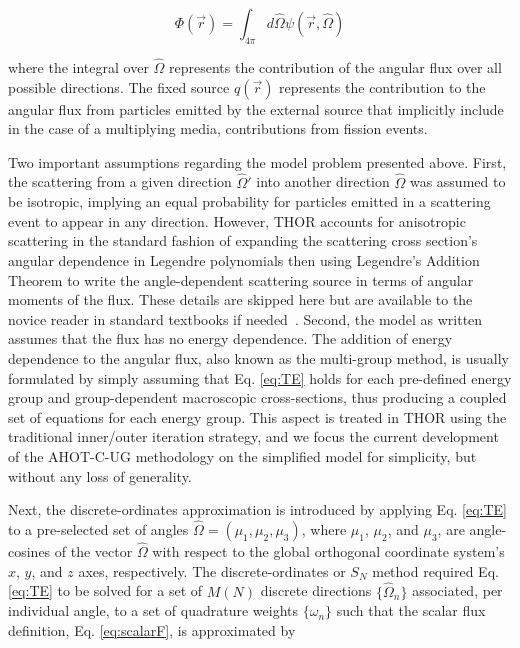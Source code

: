 \begin{equation} \label{eq:scalarF}
    \Phi ( \Vec{r} ) = \int _{4 \pi} d \hat{\Omega } \psi ( \Vec{r} , \hat{\Omega } )
\end{equation}

\noindent where the integral over $\hat{\Omega }$ represents the contribution of the angular flux over all possible directions.
The fixed source $ q ( \Vec{r} )$ represents the contribution to the angular flux from particles emitted by the external source that implicitly include in the case of a multiplying media, contributions from fission events.

Two important assumptions regarding the model problem presented above.
First, the scattering from a given direction $\hat{\Omega} ' $ into another direction $\hat{\Omega}$ was assumed to be isotropic, implying an equal probability for particles emitted in a scattering event to appear in any direction.
However, \ac{THOR} accounts for anisotropic scattering in the standard fashion of expanding the scattering cross section's angular dependence in Legendre polynomials then using Legendre's Addition Theorem to write the angle-dependent scattering source in terms of angular moments of the flux.
These details are skipped here but are available to the novice reader in standard textbooks if needed~\cite{Lewis1993}.
Second, the model as written assumes that the flux has no energy dependence.
The addition of energy dependence to the angular flux, also known as the multi-group method, is usually formulated by simply assuming that Eq. \ref{eq:TE} holds for each pre-defined energy group and group-dependent macroscopic cross-sections, thus producing a coupled set of equations for each energy group.
This aspect is treated in \ac{THOR} using the traditional inner/outer iteration strategy, and we focus the current development of the \ac{AHOT-C-UG} methodology on the simplified model for simplicity, but without any loss of generality.

Next, the discrete-ordinates approximation is introduced by applying Eq. \ref{eq:TE} to a pre-selected set of angles $\hat{\Omega} = ( \mu_1 , \mu_2 , \mu_3 )$, where $\mu_1$, $\mu_2$, and $\mu_3$, are angle-cosines of the vector $\hat{\Omega}$ with respect to the global orthogonal coordinate
system's $x$, $y$, and $z$ axes, respectively.
The discrete-ordinates or $S_N$ method required Eq. \ref{eq:TE} to be solved for a set of $M(N)$ discrete directions $\{ \hat{\Omega} _n \}$ associated, per individual angle, to a set of quadrature weights $\{ \omega_n \}$ such that the scalar flux definition, Eq. \ref{eq:scalarF}, is approximated by

